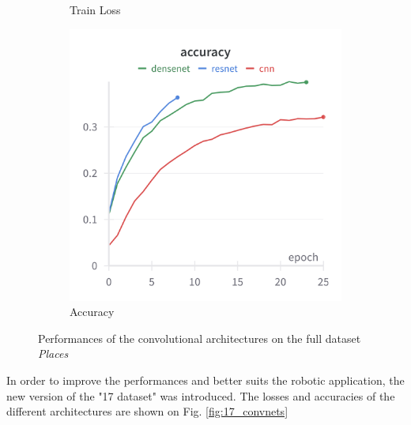 \documentclass[twocolumn,superscriptaddress,aps]{revtex4-1}
\begin{document}
\begin{figure}[H]
\begin{subfigure}{0.235 \textwidth}
        \caption{Train Loss}
    \end{subfigure}
    \begin{subfigure}{0.35 \textwidth}
        \includegraphics[width = 0.99 \textwidth]{images/205classes_accuracy.png}
        \caption{Accuracy}
    \end{subfigure}
    
    \caption{Performances of the convolutional architectures on the full dataset \textit{Places}}
    \label{fig:205_convnets}
\end{figure}

In order to improve the performances and better suits the robotic application, the new version of the "17 dataset" was introduced. The losses and accuracies of the different architectures are shown on Fig. \ref{fig:17_convnets}
\end{document}
